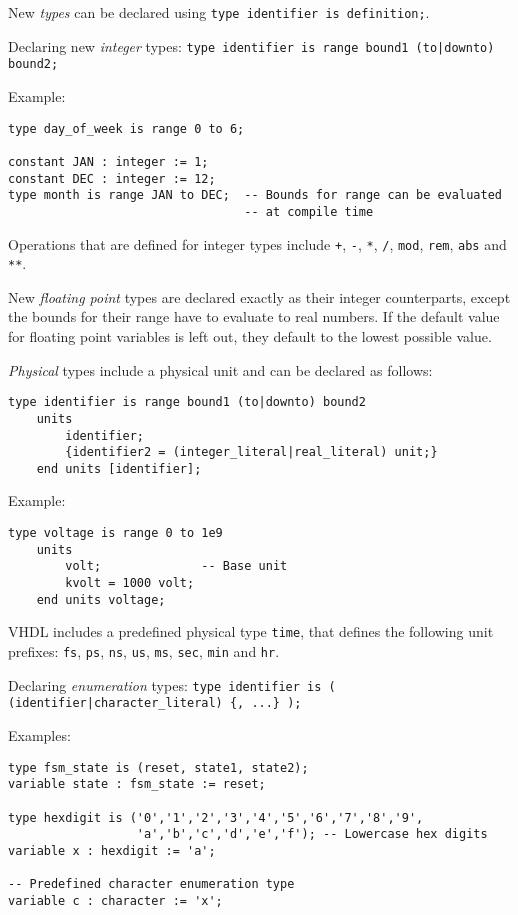 \documentclass[fontsize=11pt,a4paper]{scrartcl}
\begin{document}
New \emph{types} can be declared using \lstinline!type identifier is definition;!.

Declaring new \emph{integer} types: \lstinline!type identifier is range bound1 (to|downto) bound2;!

Example:
\begin{lstlisting}
type day_of_week is range 0 to 6;

constant JAN : integer := 1;
constant DEC : integer := 12;
type month is range JAN to DEC;  -- Bounds for range can be evaluated
                                 -- at compile time
\end{lstlisting}
Operations that are defined for integer types include \lstinline!+!, \lstinline !-!, \lstinline!*!, \lstinline!/!, \lstinline!mod!, \lstinline!rem!, \lstinline!abs! and \lstinline!**!.

New \emph{floating point} types are declared exactly as their integer counterparts, except the bounds for their range have to evaluate to real numbers. If the default value for floating point variables is left out, they default to the lowest possible value.

\emph{Physical} types include a physical unit and can be declared as follows:
\begin{lstlisting}
type identifier is range bound1 (to|downto) bound2
	units
		identifier;
		{identifier2 = (integer_literal|real_literal) unit;}
	end units [identifier];
\end{lstlisting}

Example:
\begin{lstlisting}
type voltage is range 0 to 1e9
	units
		volt;              -- Base unit
		kvolt = 1000 volt;
	end units voltage;
\end{lstlisting}
VHDL includes a predefined physical type \lstinline!time!, that defines the following unit prefixes: \lstinline!fs!, \lstinline!ps!, \lstinline!ns!, \lstinline!us!, \lstinline!ms!, \lstinline!sec!, \lstinline!min! and \lstinline!hr!.

Declaring \emph{enumeration} types: \lstinline!type identifier is ( (identifier|character_literal) {, ...} );!

Examples:
\begin{lstlisting}
type fsm_state is (reset, state1, state2);
variable state : fsm_state := reset;

type hexdigit is ('0','1','2','3','4','5','6','7','8','9',
                  'a','b','c','d','e','f'); -- Lowercase hex digits
variable x : hexdigit := 'a';

-- Predefined character enumeration type
variable c : character := 'x';
\end{lstlisting}
\end{document}
